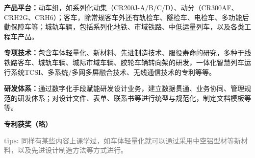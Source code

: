 \documentclass[12pt, oneside, a4paper]{ctexart}
\begin{document}
{\bf{}产品平台：}动车组，如系列化动集（CR200J-A/B/C/D）、动分（CR300AF、CRH2G、CRH6）；客车，除常规客车外还有轨检车、隧检车、电检车、多功能后勤保障车等；城轨车辆，包括系列化地铁、市域铁路、中低运量列车，以及各类工程车产品。\par{}
{\bf{}专项技术：}包含车体轻量化、新材料、先进制造技术、服役寿命的研究，多种干线铁路客车、城轨车辆、城际市域车辆、胶轮车辆转向架的研发，一体化智慧列车运行系统TCSI、多系统/多网多屏融合技术、无线通信技术的专利等等。\par{}
{\bf{}研发体系：}通过数字化手段赋能研发设计业务，建立数据贯通、业务协同、管理规范的研发体系；对设计文件、表单、联系书等进行统型与规范化，制定文档模板等等。\par{}
{\bf{}专利获奖（略）}\par{}
\textcolor{gray}{{\bf{}tips: }同样有某些内容上课学过，如车体轻量化就可以通过采用中空铝型材等新材料，以及先进设计制造方法等方式进行。}\par{}
\end{document}
